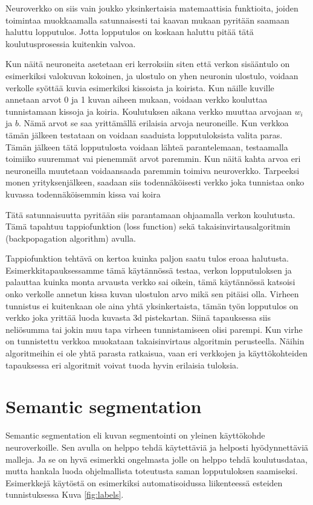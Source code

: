 Neuroverkko on siis vain joukko yksinkertaisia matemaattisia funktioita,
joiden toimintaa muokkaamalla satunnaisesti tai kaavan mukaan pyritään saamaan haluttu lopputulos.
Jotta lopputulos on koskaan haluttu pitää tätä koulutusprosessia kuitenkin valvoa.


Kun näitä neuroneita asetetaan eri kerroksiin siten että verkon sisääntulo on esimerkiksi valokuvan kokoinen, 
ja ulostulo on yhen neuronin ulostulo, 
voidaan verkolle syöttää kuvia esimerkiksi kissoista ja koirista.
Kun näille kuville annetaan arvot 0 ja 1 kuvan aiheen mukaan, voidaan verkko kouluttaa tunnistamaan kissoja ja koiria.
Koulutuksen aikana verkko muuttaa arvojaan \(w_i\) ja \(b\).
Nämä arvot se saa yrittämällä erilaisia arvoja neuroneille.
Kun verkkoa tämän jälkeen testataan on voidaan saaduista lopputuloksista valita paras.
Tämän jälkeen tätä lopputulosta voidaan lähteä parantelemaan, testaamalla toimiiko suuremmat vai pienemmät arvot paremmin.
Kun näitä kahta arvoa eri neuroneilla muutetaan voidaansaada paremmin toimiva neuroverkko.
Tarpeeksi monen yrityksenjälkeen, saadaan siis todennäköisesti verkko joka tunnistaa onko kuvassa todennäköisemmin kissa vai koira

Tätä satunnaisuutta pyritään siis parantamaan ohjaamalla verkon koulutusta.
Tämä tapahtuu tappiofunktion (loss function) sekä takaisinvirtausalgoritmin (backpopagation algorithm) avulla.

Tappiofunktion tehtävä on kertoa kuinka paljon saatu tulos eroaa halutusta.
Esimerkkitapauksessamme tämä käytännössä testaa, verkon lopputuloksen ja palauttaa kuinka monta arvausta verkko sai oikein,
tämä käytännössä katsoisi onko verkolle annetun kissa kuvan ulostulon arvo mikä sen pitäisi olla.
Virheen tunnistus ei kuitenkaan ole aina yhtä yksinkertaista, tämän työn lopputulos on verkko joka yrittää luoda kuvasta 3d pistekartan.
Siinä tapauksessa siis neliösumma tai jokin muu tapa virheen tunnistamiseen olisi parempi.
Kun virhe on tunnistettu verkkoa muokataan takaisinvirtaus algoritmin perusteella.
Näihin algoritmeihin ei ole yhtä parasta ratkaisua, vaan eri verkkojen ja käyttökohteiden tapauksessa eri algoritmit voivat tuoda hyvin erilaisia tuloksia.

\section{Semantic segmentation}

Semantic segmentation eli kuvan segmentointi on yleinen käyttökohde neuroverkoille.
Sen avulla on helppo tehdä käytettäviä ja helposti hyödynnettäviä malleja.
Ja se on hyvä esimerkki ongelmasta jolle on helppo tehdä koulutusdataa, mutta hankala luoda ohjelmallista toteutusta saman lopputuloksen saamiseksi.
Esimerkkejä käytöstä on esimerkiksi automatisoidussa liikenteessä esteiden tunnistuksessa Kuva \ref{fig:labels}.

